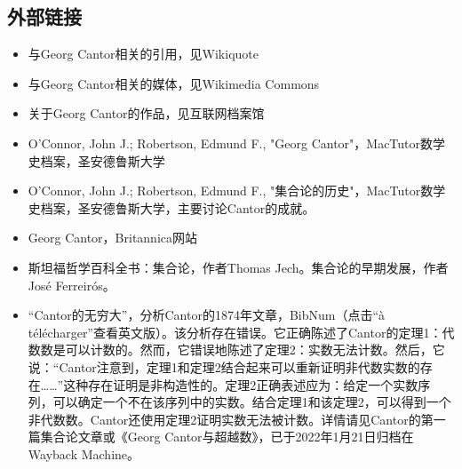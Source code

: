 \subsection{外部链接}
\begin{itemize}
\item 与Georg Cantor相关的引用，见Wikiquote
\item 与Georg Cantor相关的媒体，见Wikimedia Commons
\item 关于Georg Cantor的作品，见互联网档案馆
\item O'Connor, John J.; Robertson, Edmund F., "Georg Cantor"，MacTutor数学史档案，圣安德鲁斯大学
\item O'Connor, John J.; Robertson, Edmund F., "集合论的历史"，MacTutor数学史档案，圣安德鲁斯大学，主要讨论Cantor的成就。
\item Georg Cantor，Britannica网站
\item 斯坦福哲学百科全书：集合论，作者Thomas Jech。集合论的早期发展，作者José Ferreirós。
\item “Cantor的无穷大”，分析Cantor的1874年文章，BibNum（点击“à télécharger”查看英文版）。该分析存在错误。它正确陈述了Cantor的定理1：代数数是可以计数的。然而，它错误地陈述了定理2：实数无法计数。然后，它说：“Cantor注意到，定理1和定理2结合起来可以重新证明非代数实数的存在……”这种存在证明是非构造性的。定理2正确表述应为：给定一个实数序列，可以确定一个不在该序列中的实数。结合定理1和该定理2，可以得到一个非代数数。Cantor还使用定理2证明实数无法被计数。详情请见Cantor的第一篇集合论文章或《Georg Cantor与超越数》，已于2022年1月21日归档在Wayback Machine。
\end{itemize}